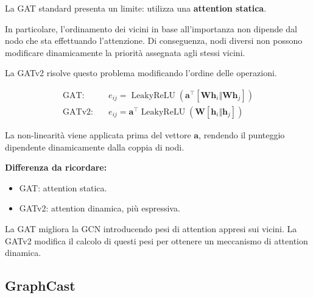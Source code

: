 \documentclass[11pt,a4paper]{article}
\begin{document}
La GAT standard presenta un limite: utilizza una
\textbf{attention statica}.

In particolare, l'ordinamento dei vicini in base
all'importanza non dipende dal nodo che sta effettuando
l'attenzione. Di conseguenza, nodi diversi non possono
modificare dinamicamente la priorità assegnata agli stessi
vicini.

La GATv2 risolve questo problema
modificando l'ordine delle operazioni.

\[
\begin{aligned}
\text{GAT:}\quad
&e_{ij}=
\operatorname{LeakyReLU}
\left(
\mathbf{a}^{\top}
[\mathbf{W}\mathbf{h}_i\Vert\mathbf{W}\mathbf{h}_j]
\right)
\\[6pt]
\text{GATv2:}\quad
&e_{ij}=
\mathbf{a}^{\top}
\operatorname{LeakyReLU}
\left(
\mathbf{W}
[\mathbf{h}_i\Vert\mathbf{h}_j]
\right)
\end{aligned}
\]

La non-linearità viene applicata prima del vettore
$\mathbf{a}$, rendendo il punteggio dipendente
dinamicamente dalla coppia di nodi.

\textbf{Differenza da ricordare:}
\begin{itemize}
    \item GAT: attention statica.
    \item GATv2: attention dinamica, più espressiva.
\end{itemize}


\begin{importante}[Da ricordare]
La GAT migliora la GCN introducendo pesi di attention
appresi sui vicini. La GATv2 modifica il calcolo di questi
pesi per ottenere un meccanismo di attention dinamica.
\end{importante}

\subsection{GraphCast}



\end{document}
